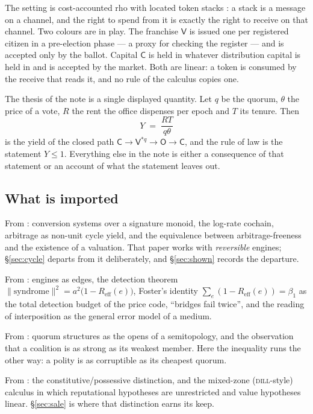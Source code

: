 \documentclass[11pt]{article}
\theoremstyle{plain}
\theoremstyle{definition}
\theoremstyle{remark}
\newcommand{\Reff}{R_{\mathrm{eff}}}
\newcommand{\bt}{\beta_1}
\newcommand{\Vt}{\mathsf{V}}
\newcommand{\Ct}{\mathsf{C}}
\newcommand{\Ot}{\mathsf{O}}
\begin{document}
The setting is cost-accounted rho \cite{CAR2026} with located token stacks
\cite{finrho,CGC2026}: a stack is a message on a channel, and the right to
spend from it is exactly the right to receive on that channel. Two colours are
in play. The franchise $\Vt$ is issued one per registered citizen in a
pre-election phase --- a proxy for checking the register --- and is accepted
only by the ballot. Capital $\Ct$ is held in whatever distribution capital is
held in and is accepted by the market. Both are linear: a token is consumed by
the receive that reads it, and no rule of the calculus copies one.

The thesis of the note is a single displayed quantity. Let $q$ be the quorum,
$\theta$ the price of a vote, $R$ the rent the office dispenses per epoch and
$T$ its tenure. Then
\[
  Y \;=\; \frac{RT}{q\theta}
\]
is the yield of the closed path
$\Ct \to \Vt^{\ast q} \to \Ot \to \Ct$, and the rule of law is the statement
$Y \le 1$. Everything else in the note is either a consequence of that
statement or an account of what the statement leaves out.

\subsection*{What is imported}

From \cite{vtok}: conversion systems over a signature monoid, the log-rate
cochain, arbitrage as non-unit cycle yield, and the equivalence between
arbitrage-freeness and the existence of a valuation. That paper works with
\emph{reversible} engines; \S\ref{sec:cycle} departs from it deliberately, and
\S\ref{sec:shown} records the departure.

From \cite{engine}: engines as edges, the detection theorem
$\lVert \text{syndrome}\rVert^2 = a^2\bigl(1-\Reff(e)\bigr)$, Foster's
identity $\sum_e (1-\Reff(e)) = \bt$ as the total detection budget of the price
code, ``bridges fail twice'', and the reading of interposition as the general
error model of a medium.

From \cite{quorum}: quorum structures as the opens of a semitopology, and the
observation that a coalition is as strong as its weakest member. Here the
inequality runs the other way: a polity is as corruptible as its cheapest
quorum.

From \cite{typedval}: the constitutive/possessive distinction, and the
mixed-zone (\textsc{dill}-style) calculus in which reputational hypotheses are
unrestricted and value hypotheses linear. \S\ref{sec:sale} is where that
distinction earns its keep.
\end{document}
